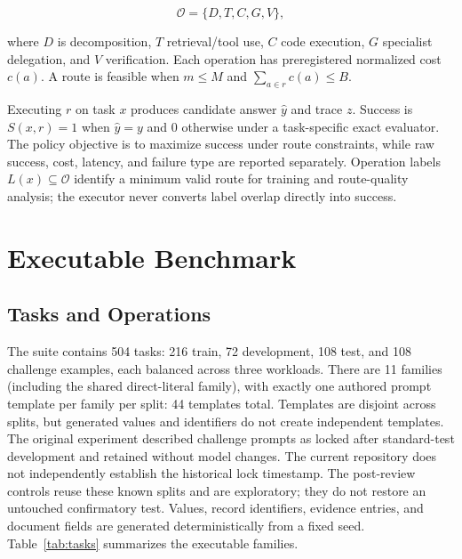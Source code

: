 \documentclass[letterpaper]{article} %
\begin{document}
\begin{equation}
\mathcal{O}=\{D,T,C,G,V\},
\end{equation}

where $D$ is decomposition, $T$ retrieval/tool use, $C$ code execution, $G$ specialist delegation, and $V$ verification. Each operation has preregistered normalized cost $c(a)$. A route is feasible when $m\leq M$ and $\sum_{a\in r}c(a)\leq B$.

Executing $r$ on task $x$ produces candidate answer $\hat{y}$ and trace $z$. Success is $S(x,r)=1$ when $\hat{y}=y$ and $0$ otherwise under a task-specific exact evaluator. The policy objective is to maximize success under route constraints, while raw success, cost, latency, and failure type are reported separately. Operation labels $L(x)\subseteq\mathcal{O}$ identify a minimum valid route for training and route-quality analysis; the executor never converts label overlap directly into success.

\section{Executable Benchmark}

\subsection{Tasks and Operations}

The suite contains 504 tasks: 216 train, 72 development, 108 test, and 108 challenge examples, each balanced across three workloads. There are 11 families (including the shared direct-literal family), with exactly one authored prompt template per family per split: 44 templates total. Templates are disjoint across splits, but generated values and identifiers do not create independent templates. The original experiment described challenge prompts as locked after standard-test development and retained without model changes. The current repository does not independently establish the historical lock timestamp. The post-review controls reuse these known splits and are exploratory; they do not restore an untouched confirmatory test. Values, record identifiers, evidence entries, and document fields are generated deterministically from a fixed seed. Table~\ref{tab:tasks} summarizes the executable families.
\end{document}
